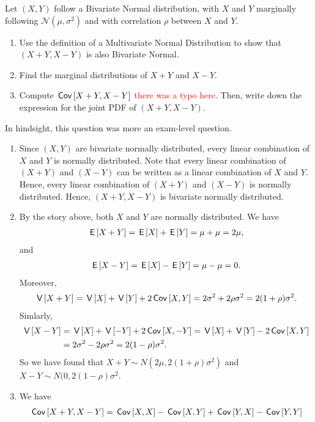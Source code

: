 \documentclass[assignments]{subfiles}
\begin{document}
\begin{exercise}
Let $(X,Y)$ follow a Bivariate Normal distribution, with $X$ and $Y$ marginally following $\mathcal{N}(\mu,\sigma^2)$ and with correlation $\rho$ between $X$ and $Y$.
\begin{enumerate}
\item Use the definition of a Multivariate Normal Distribution to show that $(X+Y, X-Y)$ is also Bivariate Normal.
\item Find the marginal distributions of $X+Y$ and $X-Y$.
\item Compute $\,\mathsf{Cov}\left[X+Y,X-Y\right]$ \textcolor{red}{there was a typo here}. Then, write down the expression for the joint PDF of $(X+Y, X-Y)$.
\end{enumerate}
\begin{solution}
In hindsight, this question was more an exam-level question.
\begin{enumerate}
    \item Since $(X,Y)$ are bivariate normally distributed, every linear combination of $X$ and $Y$ is normally distributed. Note that every linear combination of $(X+Y)$ and $(X-Y)$ can be written as a linear combination of $X$ and $Y$. Hence, every linear combination of $(X+Y)$ and $(X-Y)$ is normally distributed. Hence, $(X+Y, X-Y)$ is bivariate normally distributed.
    \item By the story above, both $X$ and $Y$ are normally distributed. We have
    \begin{align}
        \,\mathsf{E}\left[X+Y\right] = \,\mathsf{E}\left[X\right] + \,\mathsf{E}\left[Y\right] = \mu + \mu = 2\mu,
    \end{align}
    and
    \begin{align}
        \,\mathsf{E}\left[X-Y\right] = \,\mathsf{E}\left[X\right] - \,\mathsf{E}\left[Y\right] = \mu - \mu = 0.
    \end{align}
    Moreover,
    \begin{align}
        \,\mathsf{V}\left[X+Y\right] = \,\mathsf{V}\left[X\right] + \,\mathsf{V}\left[Y\right] + 2\,\mathsf{Cov}\left[X,Y\right] = 2\sigma^2 + 2\rho\sigma^2 = 2(1+\rho)\sigma^2.
    \end{align}
    Simlarly,
    \begin{align}
        \,\mathsf{V}\left[X-Y\right] &= \,\mathsf{V}\left[X\right] + \,\mathsf{V}\left[-Y\right] + 2\,\mathsf{Cov}\left[X,-Y\right] = \,\mathsf{V}\left[X\right] + \,\mathsf{V}\left[Y\right] - 2\,\mathsf{Cov}\left[X,Y\right] \\
&= 2\sigma^2 -2\rho\sigma^2 = 2(1-\rho)\sigma^2.
    \end{align}
    So we have found that $X+Y \sim N(2\mu,2(1+\rho)\sigma^2)$ and $X-Y \sim N(0, 2(1-\rho)\sigma^2$.
    \item We have
    \begin{align}
        \cov{X+Y,X-Y} &= \cov{X,X} - \cov{X,Y} + \cov{Y,X} - \cov{Y,Y} \\

\end{align}
\end{enumerate}
\end{solution}
\end{exercise}
\end{document}
